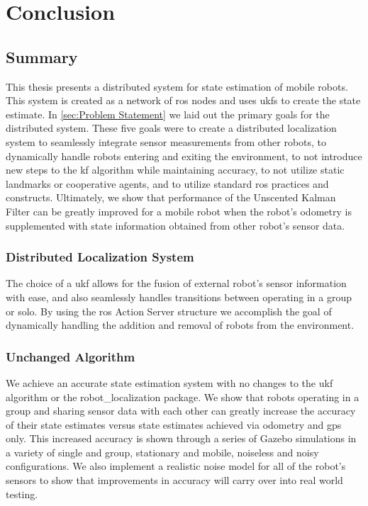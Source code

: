 \documentclass[thesis.tex]{subfile}
\begin{document}
\chapter{Conclusion} \label{ch:Conclusion}
\section{Summary}
This thesis presents a distributed system for state estimation of mobile robots. This system is created as a network of \gls{ros} nodes and uses \glspl{ukf} to create the state estimate. In \cref{sec:Problem Statement} we laid out the primary goals for the distributed system. These five goals were to create a distributed localization system to seamlessly integrate sensor measurements from other robots, to dynamically handle robots entering and exiting the environment, to not introduce new steps to the \gls{kf} algorithm while maintaining accuracy, to not utilize static landmarks or cooperative agents, and to utilize standard \gls{ros} practices and constructs. Ultimately, we show that performance of the Unscented Kalman Filter can be greatly improved for a mobile robot when the robot's odometry is supplemented with state information obtained from other robot's sensor data.

\subsection{Distributed Localization System}
The choice of a \gls{ukf} allows for the fusion of external robot's sensor information with ease, and also seamlessly handles transitions between operating in a group or solo. By using the \gls{ros} Action Server structure we accomplish the goal of dynamically handling the addition and removal of robots from the environment. 

\subsection{Unchanged Algorithm}
We achieve an accurate state estimation system with no changes to the \gls{ukf} algorithm or the robot\_localization package. We show that robots operating in a group and sharing sensor data with each other can greatly increase the accuracy of their state estimates versus state estimates achieved via odometry and \gls{gps} only. This increased accuracy is shown through a series of Gazebo simulations in a variety of single and group, stationary and mobile, noiseless and noisy configurations. We also implement a realistic noise model for all of the robot's sensors to show that improvements in accuracy will carry over into real world testing.
\end{document}
